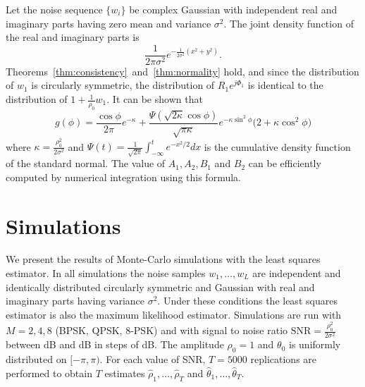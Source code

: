 \documentclass[journal]{IEEEtran}
\begin{document}
Let the noise sequence $\{w_i\}$ be complex Gaussian with independent real and imaginary parts having zero mean and variance $\sigma^2$.  The joint density function of the real and imaginary parts is
\[
\frac{1}{2\pi\sigma^2}e^{-\frac{1}{2\sigma^2}(x^2 + y^2)}.
\]
Theorems~\ref{thm:consistency}~and~\ref{thm:normality} hold, and since the distribution of $w_1$ is circularly symmetric, the distribution of $R_1e^{j\Phi_1}$ is identical to the distribution of $1 + \frac{1}{\rho_0} w_1$.
It can be shown that
\[
g(\phi) = \frac{\cos\phi}{2\pi}e^{-\kappa} + \frac{\Psi(\sqrt{2\kappa} \cos\phi)}{\sqrt{\pi\kappa}}  e^{-\kappa\sin^2\phi} \big(2 + \kappa\cos^2\phi \big)
\]
where $\kappa = \tfrac{\rho_0^2}{2\sigma^2}$ and $\Psi(t) = \frac{1}{\sqrt{2\pi}} \int_{-\infty}^{t} e^{-x^2/2} dx$
is the cumulative density function of the standard normal.
The value of $A_1, A_2, B_1$ and $B_2$ can be efficiently computed by numerical integration using this formula.


\section{Simulations}\label{sec:simulations}

We present the results of Monte-Carlo simulations with the least squares estimator.  In all simulations the noise samples $w_1,\dots,w_L$ are independent and identically distributed circularly symmetric and Gaussian with real and imaginary parts having variance $\sigma^2$.  Under these conditions the least squares estimator is also the maximum likelihood estimator.  Simulations are run with $M=2,4,8$ (BPSK, QPSK, $8$-PSK) and with signal to noise ratio $\text{SNR} = \tfrac{\rho_0^2}{2\sigma^2}$ between \unit[-20]{dB} and \unit[20]{dB} in steps of \unit[1]{dB}.  The amplitude $\rho_0=1$ and $\theta_0$ is uniformly distributed on $[-\pi, \pi)$.  For each value of SNR, $T = 5000$ replications are performed to obtain $T$ estimates $\hat{\rho}_1, \dots, \hat{\rho}_T$ and $\hat{\theta}_1, \dots, \hat{\theta}_T$.  
\end{document}
